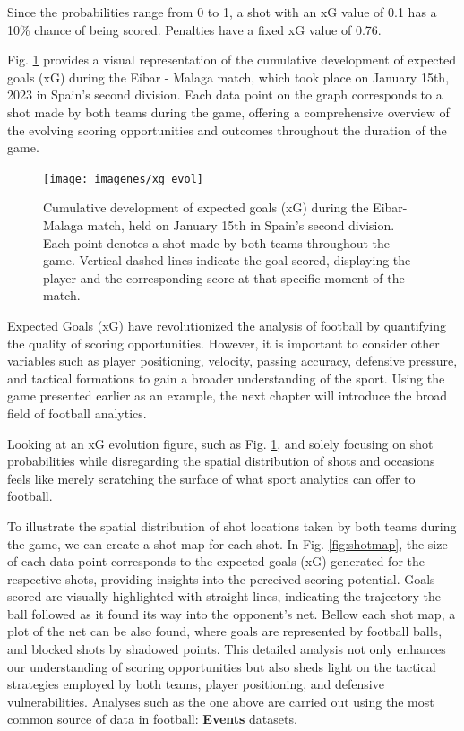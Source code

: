 \documentclass[
  10pt,
  twoside,nohyper]{book}
\begin{document}
Since the probabilities range from 0 to 1, a shot with an xG value of
0.1 has a 10\% chance of being scored. Penalties have a fixed xG value of 0.76.

Fig. \ref{fig:xg} provides a visual representation of the cumulative development of expected goals
(xG) during the Eibar - Malaga match, which took place on January 15th, 2023 in Spain's second division. Each data point on the graph
corresponds to a shot made by both teams during the game,
offering a comprehensive overview of the evolving scoring opportunities and outcomes throughout the duration of the game.

\begin{figure}[H]

{\centering \texttt{[image: imagenes/xg\_evol]} 

}

\caption{Cumulative development of expected goals (xG) during the Eibar-Malaga match, held on January 15th in Spain’s second division. Each point denotes a shot made by both teams throughout the game. Vertical dashed lines indicate the goal scored, displaying the player and the corresponding score at that specific moment of the match.}\label{fig:xg}
\end{figure}

Expected Goals (xG) have revolutionized the analysis of football by quantifying the quality of scoring opportunities. However, it is important to consider other variables such as player positioning, velocity, passing accuracy, defensive pressure, and tactical formations to gain a broader understanding of the sport. Using the game presented earlier as an example, the next chapter will introduce the broad field of football analytics.

Looking at an xG evolution figure, such as Fig. \ref{fig:xg}, and solely focusing on shot probabilities while disregarding the spatial distribution of shots and occasions feels like merely scratching the surface of what sport analytics can offer to football.

To illustrate the spatial distribution of shot locations taken by both teams during the game, we can create a shot map for each shot. In Fig. \ref{fig:shotmap}, the size of each data point corresponds to the expected goals (xG) generated for the respective shots, providing insights into the perceived scoring potential. Goals scored are visually highlighted with straight lines, indicating the trajectory the ball followed as it found its way into the opponent's net. Bellow each shot map, a plot of the net can be also found, where goals are represented by football balls, and blocked shots by shadowed points. This detailed analysis not only enhances our understanding of scoring opportunities but also sheds light on the tactical strategies employed by both teams, player positioning, and defensive vulnerabilities. Analyses such as the one above are carried out using the most common
source of data in football: \textbf{Events} datasets.
\end{document}

